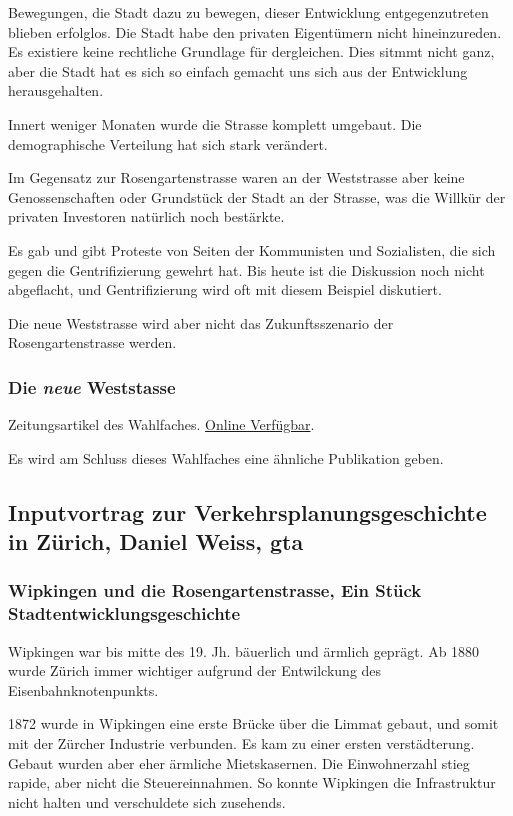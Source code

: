 \documentclass[a4paper,11pt,ngerman]{article}
\begin{document}
Bewegungen, die Stadt dazu zu bewegen, dieser Entwicklung entgegenzutreten
blieben erfolglos. Die Stadt habe den privaten Eigentümern nicht
hineinzureden. Es existiere keine rechtliche Grundlage für dergleichen. Dies
sitmmt nicht ganz, aber die Stadt hat es sich so einfach gemacht uns sich
aus der Entwicklung herausgehalten.

Innert weniger Monaten wurde die Strasse komplett umgebaut. Die
demographische Verteilung hat sich stark verändert.

Im Gegensatz zur Rosengartenstrasse waren an der Weststrasse aber keine
Genossenschaften oder Grundstück der Stadt an der Strasse, was die Willkür
der privaten Investoren natürlich noch bestärkte.

Es gab und gibt Proteste von Seiten der Kommunisten und Sozialisten, die
sich gegen die Gentrifizierung gewehrt hat. Bis heute ist die Diskussion
noch nicht abgeflacht, und Gentrifizierung wird oft mit diesem Beispiel
diskutiert.

Die neue Weststrasse wird aber nicht das Zukunftsszenario der
Rosengartenstrasse werden.

\subsubsection{Die \emph{neue} Weststasse}
\label{sec-2-1-3}

Zeitungsartikel des Wahlfaches. \href{http://www.soziologie.arch.ethz.ch/_DATA/90/FINAL_DieNeueWeststrasse_160517.pdf}{Online Verfügbar}.

Es wird am Schluss dieses Wahlfaches eine ähnliche Publikation geben.

\subsection{Inputvortrag zur Verkehrsplanungsgeschichte in Zürich, Daniel Weiss, gta}
\label{sec-2-2}

\subsubsection{Wipkingen und die Rosengartenstrasse, Ein Stück Stadtentwicklungsgeschichte}
\label{sec-2-2-1}

Wipkingen war bis mitte des 19. Jh. bäuerlich und ärmlich geprägt. Ab 1880
wurde Zürich immer wichtiger aufgrund der Entwilckung des
Eisenbahnknotenpunkts.

1872 wurde in Wipkingen eine erste Brücke über die Limmat gebaut, und somit
mit der Zürcher Industrie verbunden. Es kam zu einer ersten
verstädterung. Gebaut wurden aber eher ärmliche Mietskasernen. Die
Einwohnerzahl stieg rapide, aber nicht die Steuereinnahmen. So konnte
Wipkingen die Infrastruktur nicht halten und verschuldete sich
zusehends.
\end{document}
